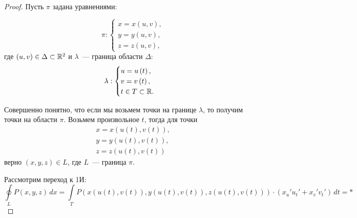 \documentclass[../../main.tex]{subfiles}
\begin{document}
		\begin{proof}
			Пусть $\pi$ задана уравнениями:
			
			\[ \pi : \begin{cases} 
			x = x\left( u,v\right), \\ 
			y = y\left( u,v\right), \\ 
			z = z\left( u,v\right),  
			\end{cases} \]
			где $\left( u,v \right) \in \Delta \subset \mathbb{R}^2$ и $\lambda$~--- 
			граница области $\Delta$:
			\[ \lambda : \begin{cases} 
			u = u \left( t \right),  \\ 
			v = v \left( t \right), \\ 
			t \in T \subset \mathbb{R}.  
			\end{cases} \]
			
			Совершенно понятно, что если мы возьмем точки на границе $\lambda$, то 
			получим точки на области $\pi$. Возьмем произвольное $t$, тогда для точки
			 \begin{gather*} x = x( u( t), v( t)   ), \\
			 y = y( u( t), v( t)   ), \\
			 z = z( u( t), v( t)   )
			 \end{gather*}
			 верно $(x, y, z) \in L$, где $L$~--- граница $\pi$.
			 
			 Рассмотрим переход к 1И:
			 \[ \oint \limits_L P( x,y,z ) \, dx = \int \limits_T P ( x( u( t), v( t)   
			 ), y( u( t), v( t)   )  ,z( u( t), v( t)   ) ) \cdot ( x_u' u_t' + x_v' 
			 v_t' ) \, dt = *  \]
			 

\end{proof}
\end{document}
